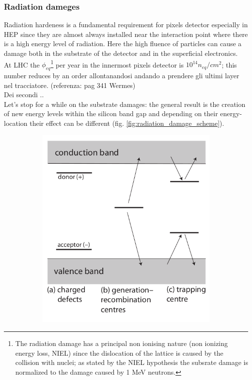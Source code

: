 \begin{titlepage}
\subsubsection{Radiation dameges}
Radiation hardeness is a fundamental requirement for pixels detector especially in HEP since they are almost always installed near the interaction point where there is a high energy level of radiation.
Here the high fluence of particles can cause a damage both in the substrate of the detector and in the superficial electronics.\\
At LHC the $\phi_{eq}$\footnote{The radiation damage has a principal non ionising nature (non ionizing energy loss, NIEL) since the dislocation of the lattice is caused by the collision with nuclei; as stated by the NIEL hypothesis the subsrate damage is normalized to the damage caused by 1 MeV neutrons.} per year in the innermost pixels detector is $10^{14} n_{eq}/cm^2$; this number reduces by an order allontanandosi andando a prendere gli ultimi layer nel tracciatore. (referenza: pag 341 Wermes)\\
Dei secondi ..\\
Let's stop for a while on the substrate damages: the general result is the creation of new energy levels within the silicon band gap and depending on their energy-location their effect can be different (fig. \ref{fig:radiation_damage_scheme}). 
\begin{figure}
   \begin{subfigure}{.5\textwidth}
     \centering
     \includegraphics[width=.8\linewidth]{figures/radiation_damage_scheme.png}

\end{subfigure}
\end{figure}
\end{titlepage}
